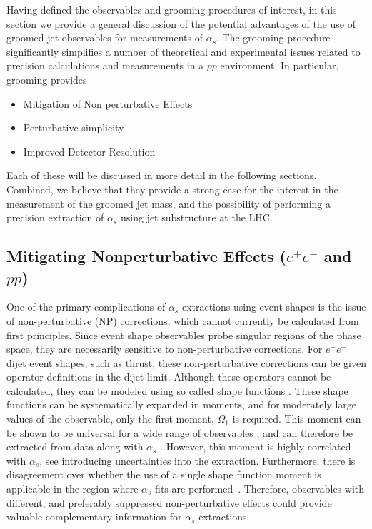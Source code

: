 
Having defined the observables and grooming procedures of interest, in this section we provide a general discussion of the potential advantages of the use of groomed jet observables for measurements of $\alpha_s$. The grooming procedure significantly simplifies a number of theoretical and experimental issues related to precision calculations and measurements in a $pp$ environment. In particular, grooming provides
\begin{itemize}
\item Mitigation of Non perturbative Effects
\item Perturbative simplicity
\item Improved Detector Resolution
\end{itemize}
Each of these will be discussed in more detail in the following sections.  Combined, we believe that they provide a strong case for the interest in the measurement of the groomed jet mass, and the possibility of performing a precision extraction of $\alpha_s$ using jet substructure at the LHC.




\subsection{Mitigating Nonperturbative Effects ($e^+e^-$ and $pp$)}

One of the primary complications of $\alpha_s$ extractions using event shapes is the issue of non-perturbative (NP) corrections, which cannot currently be calculated from first principles. Since event shape observables probe singular regions of the phase space, they are necessarily sensitive to non-perturbative corrections.  For $e^+e^-$ dijet event shapes, such as thrust, these non-perturbative corrections can be given operator definitions in the dijet limit. Although these operators cannot be calculated, they can be modeled using so called shape functions \cite{Korchemsky:1999kt,Korchemsky:2000kp,Hoang:2007vb,Ligeti:2008ac}. These shape functions can be systematically expanded in moments, and for moderately large values of the observable, only the first moment, $\Omega_1$ is required. This moment can be shown to be universal for a wide range of observables \cite{Lee:2006fn,Lee:2007jr}, and can therefore be extracted from data along with $\alpha_s$ \cite{Abbate:2010xh,Abbate:2012jh,Hoang:2015hka}. However, this moment is highly correlated with $\alpha_s$, see  introducing  uncertainties into the extraction. Furthermore, there is disagreement over whether the use of a single shape function moment is applicable in the region where $\alpha_s$ fits are performed~\cite{}. Therefore, observables with different, and preferably suppressed  non-perturbative effects could provide valuable complementary information for $\alpha_s$ extractions.

